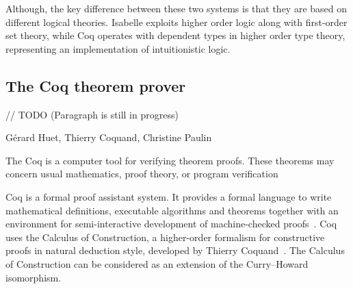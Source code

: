 \documentclass[article]{aaltoseries}
\begin{document}
Although, the key difference between these two systems is that they are based on different logical theories. Isabelle exploits higher order logic along with first-order set theory, while Coq operates with dependent types in higher order type theory, representing an implementation of intuitionistic logic.








\subsection{The Coq theorem prover}
\label{sec:prover_coq}

// TODO (Paragraph is still in progress)

Gérard Huet, Thierry Coquand, Christine Paulin

The Coq is a computer tool for verifying theorem proofs. These theorems may concern usual mathematics, proof theory, or program verification

Coq is a formal proof assistant system. It provides a formal language to write mathematical definitions, executable algorithms and theorems together with an environment for semi-interactive development of machine-checked proofs~\cite{tool_Coq}. Coq uses the Calculus of Construction, a higher-order formalism for constructive proofs in natural deduction style, developed by Thierry Coquand~\cite{Coq86}. 
The Calculus of Construction can be considered as an extension of the Curry–Howard isomorphism. %
\end{document}
